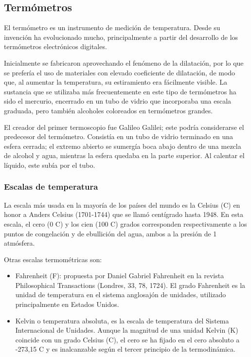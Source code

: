 \subsection{Termómetros}
	\par 
		El termómetro es un instrumento de medición de temperatura. Desde su invención ha evolucionado mucho, principalmente a partir del desarrollo de los termómetros electrónicos digitales.
	\par \noindent
		Inicialmente se fabricaron aprovechando el fenómeno de la dilatación, por lo que se prefería el uso de materiales con elevado coeficiente de dilatación, de modo que, al aumentar la temperatura, su estiramiento era fácilmente visible. La sustancia que se utilizaba más frecuentemente en este tipo de termómetros ha sido el mercurio, encerrado en un tubo de vidrio que incorporaba una escala graduada, pero también alcoholes coloreados en termómetros grandes.
	\par \noindent
		El creador del primer termoscopio fue Galileo Galilei; este podría considerarse el predecesor del termómetro. Consistía en un tubo de vidrio terminado en una esfera cerrada; el extremo abierto se sumergía boca abajo dentro de una mezcla de alcohol y agua, mientras la esfera quedaba en la parte superior. Al calentar el líquido, este subía por el tubo.
		
	\subsubsection{Escalas de temperatura}
		\par 
			La escala más usada en la mayoría de los países del mundo es la Celsius (\textdegree{}C) en honor a Anders Celsius (1701-1744) que se llamó centígrado hasta 1948. En esta escala, el cero (0 \textdegree{}C) y los cien (100 \textdegree{}C) grados corresponden respectivamente a los puntos de congelación y de ebullición del agua, ambos a la presión de 1 atmósfera.
			
		\par \noindent 
		Otras escalas termométricas son:
			
		\begin{itemize}
			\item Fahrenheit (\textdegree{}F):  propuesta por Daniel Gabriel Fahrenheit en la revista Philosophical Transactions (Londres, 33, 78, 1724). El grado Fahrenheit es la unidad de temperatura en el sistema anglosajón de unidades, utilizado principalmente en Estados Unidos.
			
			\item Kelvin o temperatura absoluta, es la escala de temperatura del Sistema Internacional de Unidades. Aunque la magnitud de una unidad Kelvin (K) coincide con un grado Celsius (\textdegree{}C), el cero se ha fijado en el cero absoluto a -273,15 \textdegree{}C y es inalcanzable según el tercer principio de la termodinámica.
		\end{itemize}
	
